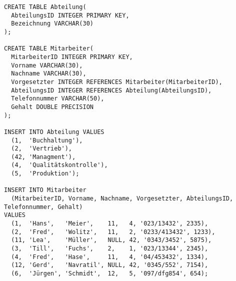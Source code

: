\documentclass{bschlangaul-aufgabe}
\begin{document}
\begin{liAdditum}[Übungsdatenbank]
\begin{verbatim}
CREATE TABLE Abteilung(
  AbteilungsID INTEGER PRIMARY KEY,
  Bezeichnung VARCHAR(30)
);

CREATE TABLE Mitarbeiter(
  MitarbeiterID INTEGER PRIMARY KEY,
  Vorname VARCHAR(30),
  Nachname VARCHAR(30),
  Vorgesetzter INTEGER REFERENCES Mitarbeiter(MitarbeiterID),
  AbteilungsID INTEGER REFERENCES Abteilung(AbteilungsID),
  Telefonnummer VARCHAR(50),
  Gehalt DOUBLE PRECISION
);

INSERT INTO Abteilung VALUES
  (1,  'Buchhaltung'),
  (2,  'Vertrieb'),
  (42, 'Managment'),
  (4,  'Qualitätskontrolle'),
  (5,  'Produktion');

INSERT INTO Mitarbeiter
  (MitarbeiterID, Vorname, Nachname, Vorgesetzter, AbteilungsID, Telefonnummer, Gehalt)
VALUES
  (1,  'Hans',   'Meier',    11,   4, '023/13432', 2335),
  (2,  'Fred',   'Wolitz',   11,   2, '0233/413432', 1233),
  (11, 'Lea',    'Müller',   NULL, 42, '0343/3452', 5875),
  (3,  'Till',   'Fuchs',    2,    1, '023/13344', 2345),
  (4,  'Fred',   'Hase',     11,   4, '04/453432', 1334),
  (12, 'Gerd',   'Navratil', NULL, 42, '0345/552', 7154),
  (6,  'Jürgen', 'Schmidt',  12,   5, '097/dfg854', 654);
\end{verbatim}
\end{liAdditum}
\end{document}
